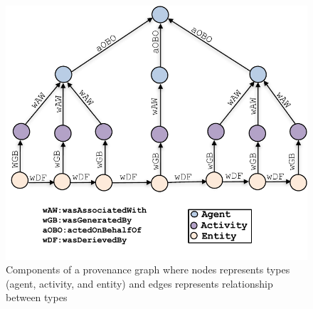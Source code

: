 %
%
%
%
%
%
%







\begin{figure}[h!]
\begin{center}
\includegraphics[width=\columnwidth]{picture13.pdf}
\end{center}
\caption{Components of a provenance graph where nodes represents types (agent, activity, and entity) and edges represents relationship between types}
\label{Provenance_Sensor}
\end{figure}


